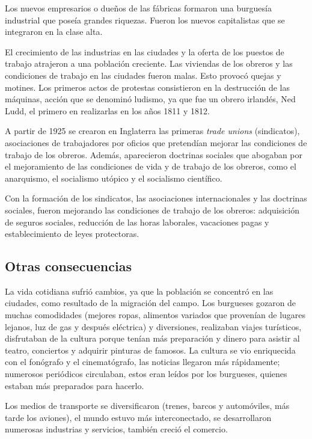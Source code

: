 \documentclass{article}
\begin{document}
  Los nuevos empresarios o dueños de las fábricas formaron una burguesía industrial que poseía grandes riquezas. Fueron los nuevos capitalistas que se integraron en la clase alta.

  El crecimiento de las industrias en las ciudades y la oferta de los puestos de trabajo atrajeron a una población creciente. Las viviendas de los obreros y las condiciones de trabajo en las ciudades fueron malas. Esto provocó quejas y motines. Los primeros actos de protestas consistieron en la destrucción de las máquinas, acción que se denominó ludismo, ya que fue un obrero irlandés, Ned Ludd, el primero en realizarlas en los años 1811 y 1812.
  
  A partir de 1925 se crearon en Inglaterra las primeras \textit{trade unions} (sindicatos), asociaciones de trabajadores por oficios que pretendían mejorar las condiciones de trabajo de los obreros. Además, aparecieron doctrinas sociales que abogaban por el mejoramiento de las condiciones de vida y de trabajo de los obreros, como el anarquismo, el socialismo utópico y el socialismo científico.

  Con la formación de los sindicatos, las asociaciones internacionales y las doctrinas sociales, fueron mejorando las condiciones de trabajo de los obreros: adquisición de seguros sociales, reducción de las horas laborales, vacaciones pagas y establecimiento de leyes protectoras.

  \subsection*{Otras consecuencias}
  La vida cotidiana sufrió cambios, ya que la población se concentró en las ciudades, como resultado de la migración del campo. Los burgueses gozaron de muchas comodidades (mejores ropas, alimentos variados que provenían de lugares lejanos, luz de gas y después eléctrica) y diversiones, realizaban viajes turísticos, disfrutaban de la cultura porque tenían más preparación y dinero para asistir al teatro, conciertos y adquirir pinturas de famosos. La cultura se vio enriquecida con el fonógrafo y el cinematógrafo, las noticias llegaron más rápidamente; numerosos periódicos circulaban, estos eran leídos por los burgueses, quienes estaban más preparados para hacerlo.

  Los medios de transporte se diversificaron (trenes, barcos y automóviles, más tarde los aviones), el mundo estuvo más interconectado, se desarrollaron numerosas industrias y servicios, también creció el comercio.
\end{document}
